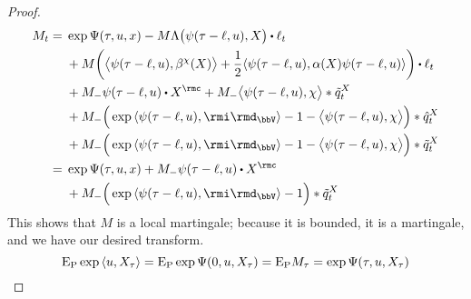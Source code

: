 \begin{proof}
  \begin{align*}
    M_t 
    &= \begin{aligned}[t]
      &\exp\aff(\tau, \momentVar, \stateVar) 
      - M \ode\big(\affPart(\tau-\leb, \momentVar), \X\big) \shortInt \leb_t \\
      &+ M \bigg( \bprj{\affPart(\tau-\leb, \momentVar)}{\affDrift^\trunc(\X)} + \frac12 \prj{\affPart(\tau-\leb,\momentVar)}{\affDiff(\X)\affPart(\tau-\leb,\momentVar)} \bigg) \shortInt \leb_t \\
      &+ M_- \affPart(\tau-\leb, \momentVar) \shortInt \X^\rmc
      + M_- \bprj{\affPart(\tau-\leb,\momentVar)}{\trunc} \ast \compensate{\jumpMeas^\X}_t \\
      &+ M_- \Big( \exp\prj{\affPart(\tau-\leb,\momentVar)}{\id_\vecSpace} - 1 - \bprj{\affPart(\tau-\leb,\momentVar)}{\trunc} \Big) \ast \predproj{\jumpMeas^\X}_t \\
      &+ M_- \Big( \exp\prj{\affPart(\tau-\leb,\momentVar)}{\id_\vecSpace} - 1 - \bprj{\affPart(\tau-\leb,\momentVar)}{\trunc} \Big) \ast \compensate{\jumpMeas^\X}_t 
    \end{aligned} \\
    &= \begin{aligned}[t]
      &\exp\aff(\tau, \momentVar, \stateVar) 
      + M_- \affPart(\tau-\leb, \momentVar) \shortInt \X^\rmc \\
      &+ M_- \Big( \exp\prj{\affPart(\tau-\leb,\momentVar)}{\id_\vecSpace} - 1 \Big) \ast \compensate{\jumpMeas^\X}_t 
    \end{aligned}
  \end{align*}
  This shows that $M$ is a local martingale; because it is bounded, it is a martingale, and we have our desired transform.
  \begin{equation*}
    {\operatorname{E}}_{\operatorname{P}} \exp{\langle u, X_\tau \rangle} = {\operatorname{E}}_{\operatorname{P}} \exp\Psi(0, u, X_\tau) = {\operatorname{E}}_{\operatorname{P}} M_\tau = \exp\Psi(\tau, u, X_\tau)
  \end{equation*}
\end{proof}
